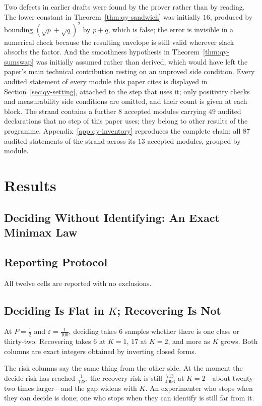 \documentclass[conference]{IEEEtran}
\theoremstyle{definition}
\begin{document}
Two defects in earlier drafts were found by the prover rather than by reading. The lower
constant in Theorem~\ref{thm:qy-sandwich} was initially $16$, produced by bounding
$(\sqrt{p}+\sqrt{q})^{2}$ by $p+q$, which is false; the error is invisible in a numerical
check because the resulting envelope is still valid wherever slack absorbs the factor. And the
smoothness hypothesis in Theorem~\ref{thm:qy-sumswap} was initially assumed rather than derived,
which would have left the paper's main technical contribution resting on an unproved side
condition. Every audited statement of every module this paper cites is displayed in Section~\ref{sec:qy-setting}, attached to the step that uses it; only positivity checks and measurability side conditions are omitted, and their count is given at each block. The strand contains a further $8$ accepted modules carrying $49$ audited declarations that no step of this paper uses; they belong to other results of the programme. Appendix~\ref{app:qy-inventory} reproduces the complete chain: all $87$ audited statements of the strand across its $13$ accepted modules, grouped by module.


\section{Results}

\subsection{Deciding Without Identifying: An Exact Minimax Law}
\label{sec:sp-results}

\subsection{Reporting Protocol}

All twelve cells are reported with no exclusions.

\subsection{Deciding Is Flat in $K$; Recovering Is Not}

At $P=\tfrac12$ and $\varepsilon=\tfrac{1}{100}$, deciding takes $6$ samples whether there is
one class or thirty-two. Recovering takes $6$ at $K=1$, $17$ at $K=2$, and more as $K$ grows.
Both columns are exact integers obtained by inverting closed forms.

The risk columns say the same thing from the other side. At the moment the decide risk has
reached $\tfrac{1}{128}$, the recovery risk is still $\tfrac{713}{4096}$ at $K=2$---about
twenty-two times larger---and the gap widens with $K$. An experimenter who stops when they can
decide is done; one who stops when they can identify is still far from it.
\end{document}
